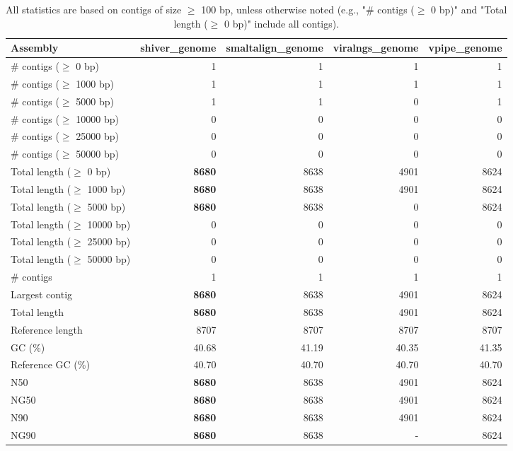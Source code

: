 \documentclass[12pt,a4paper]{article}
\begin{document}
\begin{table}[ht]
\begin{center}
\caption{All statistics are based on contigs of size $\geq$ 100 bp, unless otherwise noted (e.g., "\# contigs ($\geq$ 0 bp)" and "Total length ($\geq$ 0 bp)" include all contigs).}
\begin{tabular}{|l*{4}{|r}|}
\hline
Assembly & shiver\_genome & smaltalign\_genome & viralngs\_genome & vpipe\_genome \\ \hline
\# contigs ($\geq$ 0 bp) & 1 & 1 & 1 & 1 \\ \hline
\# contigs ($\geq$ 1000 bp) & 1 & 1 & 1 & 1 \\ \hline
\# contigs ($\geq$ 5000 bp) & 1 & 1 & 0 & 1 \\ \hline
\# contigs ($\geq$ 10000 bp) & 0 & 0 & 0 & 0 \\ \hline
\# contigs ($\geq$ 25000 bp) & 0 & 0 & 0 & 0 \\ \hline
\# contigs ($\geq$ 50000 bp) & 0 & 0 & 0 & 0 \\ \hline
Total length ($\geq$ 0 bp) & {\bf 8680} & 8638 & 4901 & 8624 \\ \hline
Total length ($\geq$ 1000 bp) & {\bf 8680} & 8638 & 4901 & 8624 \\ \hline
Total length ($\geq$ 5000 bp) & {\bf 8680} & 8638 & 0 & 8624 \\ \hline
Total length ($\geq$ 10000 bp) & 0 & 0 & 0 & 0 \\ \hline
Total length ($\geq$ 25000 bp) & 0 & 0 & 0 & 0 \\ \hline
Total length ($\geq$ 50000 bp) & 0 & 0 & 0 & 0 \\ \hline
\# contigs & 1 & 1 & 1 & 1 \\ \hline
Largest contig & {\bf 8680} & 8638 & 4901 & 8624 \\ \hline
Total length & {\bf 8680} & 8638 & 4901 & 8624 \\ \hline
Reference length & 8707 & 8707 & 8707 & 8707 \\ \hline
GC (\%) & 40.68 & 41.19 & 40.35 & 41.35 \\ \hline
Reference GC (\%) & 40.70 & 40.70 & 40.70 & 40.70 \\ \hline
N50 & {\bf 8680} & 8638 & 4901 & 8624 \\ \hline
NG50 & {\bf 8680} & 8638 & 4901 & 8624 \\ \hline
N90 & {\bf 8680} & 8638 & 4901 & 8624 \\ \hline
NG90 & {\bf 8680} & 8638 & - & 8624 \\ \hline

\end{tabular}
\end{center}
\end{table}
\end{document}
